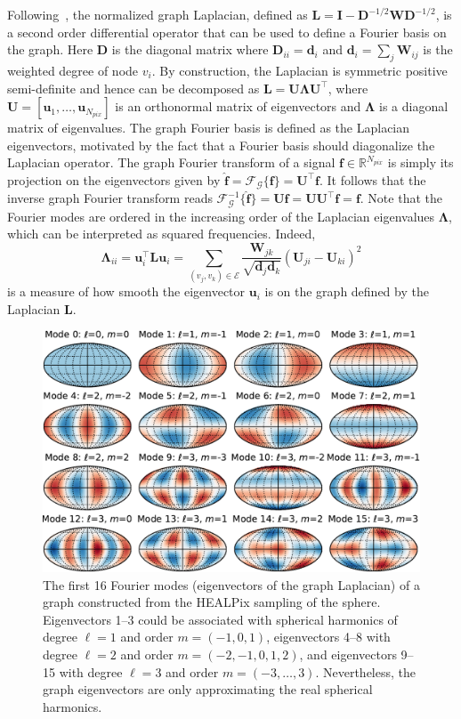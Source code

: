 \documentclass[final,twocolumn,3p,times,authoryear]{elsarticle}
\renewcommand{\b}[1]{{\bm{#1}}}   %
\newcommand{\1}{\b{1}}              %
\newcommand{\0}{\b{0}}              %
\newcommand{\G}{\mathcal{G}}
\newcommand{\E}{\mathcal{E}}
\renewcommand{\L}{\b{L}}
\newcommand{\W}{\b{W}}
\newcommand{\I}{\b{I}}
\newcommand{\D}{\b{D}}
\newcommand{\U}{\b{U}}
\newcommand{\f}{\b{f}}
\newcommand{\trans}{^\intercal}
\newcommand{\R}{\mathbb{R}}
\newcommand{\bLambda}{\b{\Lambda}}
\begin{document}
Following~\cite{shuman2013emerging}, the normalized graph Laplacian,
defined as $\L = \I - \D^{-1/2} \W \D^{-1/2}$, is a second order differential operator
that can be used to define a Fourier basis on the graph. Here $\D$ is the diagonal
matrix where $\D_{ii} = \b{d}_i$ and $\b{d}_i = \sum_j \W_{ij}$ is the weighted degree of node $v_i$. By construction, the Laplacian is symmetric positive
semi-definite and hence can be decomposed as $\L = \U \bLambda \U\trans$, where $\U = [\b u_1, \ldots, \b u_{N_{pix}}]$ is an
orthonormal matrix of eigenvectors and $\bLambda$ is a diagonal matrix of
eigenvalues. The graph Fourier basis is defined as the Laplacian eigenvectors, motivated by the fact that a Fourier basis should diagonalize the Laplacian operator.
The graph Fourier transform of a signal $\f \in \R^{N_{pix}}$ is simply its projection on the eigenvectors given by
$\hat{\f} = \mathcal{F}_\G \{\f\} = \U\trans \f$. It follows that the inverse graph Fourier transform reads $\mathcal{F}^{-1}_\G \{\hat{\f}\} = \U\hat{\f} = \U \U\trans \f = \f$.
Note that the Fourier modes are ordered in the increasing order of the Laplacian eigenvalues $\bLambda$, which can be interpreted as squared frequencies.
Indeed,
\begin{equation*}
	\bLambda_{ii} = \b u_i\trans \L \b u_i = \sum_{(v_j, v_k) \in \E} \frac{\W_{jk}}{\sqrt{\b d_j \b d_k}} (\U_{ji} - \U_{ki})^2
\end{equation*}
is a measure of how smooth the eigenvector $\b u_i$ is on the graph defined by the Laplacian $\L$.

\begin{figure}
	\centering
	\includegraphics[width=\linewidth]{eigenvectors}
	\caption{The first 16 Fourier modes (eigenvectors of the graph Laplacian) of a graph constructed from the HEALPix sampling of the sphere. Eigenvectors 1--3 could be associated with spherical harmonics of degree $\ell=1$ and order $m=(-1,0,1)$, eigenvectors 4--8 with degree $\ell=2$ and order $m=(-2,-1,0,1,2)$, and eigenvectors 9--15 with degree $\ell=3$ and order $m=(-3,\ldots,3)$. Nevertheless, the graph eigenvectors are only approximating the real spherical harmonics.}
	\label{fig:graph_harmonics}
\end{figure}
\end{document}
